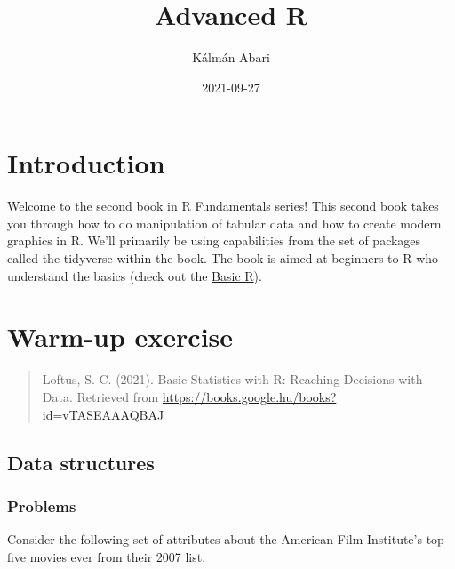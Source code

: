 \documentclass[
]{book}
\title{Advanced R}
\author{Kálmán Abari}
\date{2021-09-27}
\begin{document}
\maketitle

{
\setcounter{tocdepth}{1}
\tableofcontents
}
\hypertarget{introduction}{%
\chapter{Introduction}\label{introduction}}

Welcome to the second book in R Fundamentals series! This second book takes you through how to do manipulation of tabular data and how to create modern graphics in R. We'll primarily be using capabilities from the set of packages called the tidyverse within the book. The book is aimed at beginners to R who understand the basics (check out the \href{https://abarik.github.io/basicr_2020_21_2/}{Basic R}).

\hypertarget{warm-up-exercise}{%
\chapter{Warm-up exercise}\label{warm-up-exercise}}

\begin{quote}
Loftus, S. C. (2021). Basic Statistics with R: Reaching Decisions with Data. Retrieved from \url{https://books.google.hu/books?id=vTASEAAAQBAJ}
\end{quote}

\hypertarget{data-structures}{%
\section{Data structures}\label{data-structures}}

\hypertarget{problems}{%
\subsection{Problems}\label{problems}}

Consider the following set of attributes about the American Film Institute's top-five movies ever from their 2007 list.
\end{document}
